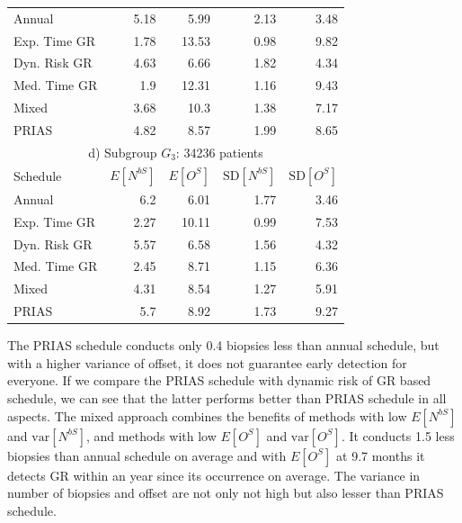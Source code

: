 \begin{table}
\begin{tabular}{lrrrr}
\hline
Annual         & 5.18            & 5.99                & 2.13          & 3.48              \\
Exp. Time GR & 1.78            & 13.53               & 0.98          & 9.82              \\
Dyn. Risk GR       & 4.63            & 6.66                & 1.82          & 4.34              \\
Med. Time GR & 1.9             & 12.31               & 1.16          & 9.43              \\
Mixed       & 3.68            & 10.3                & 1.38          & 7.17              \\
PRIAS          & 4.82            & 8.57                & 1.99          & 8.65        \\
\hline      
\multicolumn{5}{c}{d) Subgroup $G_3$: 34236 patients}\\
\hline
Schedule        & $E[N^{bS}]$ & $E[O^{S}]$ & ${\mbox{SD}[N^{bS}]}$ & ${\mbox{SD}[O^S]}$ \\
\hline
Annual         & 6.2             & 6.01                & 1.77          & 3.46              \\
Exp. Time GR & 2.27            & 10.11               & 0.99          & 7.53              \\
Dyn. Risk GR       & 5.57            & 6.58                & 1.56          & 4.32              \\
Med. Time GR & 2.45            & 8.71                & 1.15          & 6.36              \\
Mixed       & 4.31            & 8.54                & 1.27          & 5.91              \\
PRIAS          & 5.7             & 8.92                & 1.73          & 9.27        \\
\hline     
\end{tabular}
\end{table}

The PRIAS schedule conducts only 0.4 biopsies less than annual schedule, but with a higher variance of offset, it does not guarantee early detection for everyone. If we compare the PRIAS schedule with dynamic risk of GR based schedule, we can see that the latter performs better than PRIAS schedule in all aspects. The mixed approach combines the benefits of methods with low $E[N^{bS}]$ and $\mbox{var}[N^{bS}]$, and methods with low $E[O^{S}]$ and $\mbox{var}[O^S]$. It conducts 1.5 less biopsies than annual schedule on average and with $E[O^{S}]$ at 9.7 months it detects GR within an year since its occurrence on average. The variance in number of biopsies and offset are not only not high but also lesser than PRIAS schedule.

